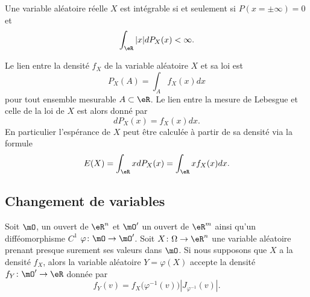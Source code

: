 \begin{proposition}
	Une variable aléatoire réelle \( X\) est intégrable si et seulement si \( P(x=\pm\infty)=0\) et
	\begin{equation}
		\int_{\eR}| x |dP_X(x)<\infty.
	\end{equation}
\end{proposition}

Le lien entre la densité \( f_X\) de la variable aléatoire \( X\) et sa loi est
\begin{equation}
	P_X(A)=\int_Af_X(x)dx
\end{equation}
pour tout ensemble mesurable \( A\subset\eR\). Le lien entre la mesure de Lebesgue et celle de la loi de \( X\) est alors donné par
\begin{equation}
	dP_X(x)=f_X(x)dx.
\end{equation}
En particulier l'espérance de \( X\) peut être calculée à partir de sa densité via la formule
\begin{equation}        \label{EqEspDensform}
	E(X)=\int_{\eR}xdP_X(x)=\int_{\eR}x f_X(x)dx.
\end{equation}

\subsection{Changement de variables}

\begin{theorem}
	Soit \( \mO\), un ouvert de \( \eR^n\) et \( \mO'\) un ouvert de \( \eR^m\) ainsi qu'un difféomorphisme \( C^1\) \( \varphi\colon \mO\to \mO'\). Soit \( X\colon \Omega\to \eR^n\) une variable aléatoire prenant presque surement ses valeurs dans \( \mO\). Si nous supposons que \( X\) a la densité \( f_X\), alors la variable aléatoire \( Y=\varphi(X)\) accepte la densité \( f_Y\colon \mO'\to \eR\) donnée par
	\begin{equation}
		f_Y(v)=f_X\big( \varphi^{-1}(v) \big)| J_{\varphi^{-1}}(v) |.
	\end{equation}
\end{theorem}

